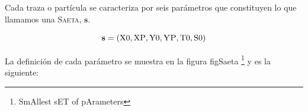 \documentclass[a4paper]{article}
\let\vec\mathbf  %
\begin{document}
% 
% 
% 
% 
% 

Cada traza o partícula se caracteriza por seis parámetros que constituyen lo que llamamos una \textsc{Saeta}, $\vec{s}$. 

\begin{equation}
    \vec{s} = (\textrm{X0}, \textrm{XP}, \textrm{Y0}, \textsc{YP}, \textrm{T0}, \textrm{S0})
    \label{eq:saeta}
\end{equation}

La definición de cada parámetro se muestra en la figura figSaeta \footnote{SmAllest sET of pArameters} y es la siguiente:
\end{document}
